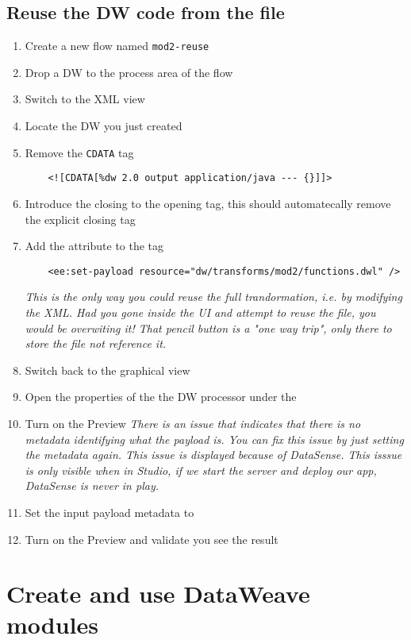 \subsection{Reuse the DW code from the file}
\begin{enumerate}[resume*]
\item Create a new flow named \lstinline!mod2-reuse!
\item Drop a DW to the process area of the flow
\item Switch to the XML view
\item Locate the DW you just created
\item Remove the \lstinline!CDATA! tag
  \begin{lstlisting}
    <![CDATA[%dw 2.0 output application/java --- {}]]>
  \end{lstlisting}
\item Introduce the \ttt{/} closing to the opening  tag, this should automatecally remove the explicit closing tag
\item Add the attribute  to the  tag
  \begin{lstlisting}
    <ee:set-payload resource="dw/transforms/mod2/functions.dwl" />
  \end{lstlisting}
  \emph{
    This is the only way you could reuse the full trandormation, i.e. by modifying the XML.  Had you gone inside
    the UI and attempt to reuse the file, you would be overwiting it!  That pencil button is a "one way trip",
    only there to store the file not reference it.
  }
\item Switch back to the graphical view
\item Open the properties of the the DW processor under the 
\item Turn on the Preview
  \emph{
    There is an issue that indicates that there is no metadata identifying what the payload is.  You can fix
    this issue by just setting the metadata again.  This issue is displayed because of DataSense.  This isssue
    is only visible when in Studio, if we start the server and deploy our app, DataSense is never in play. 
  }
\item Set the input payload metadata to 
\item Turn on the Preview and validate you see the result
\end{enumerate}




\section{Create and use DataWeave modules}

